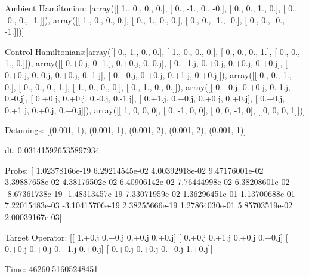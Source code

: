 \documentclass{article}
\begin{document}
    

\newpage

Ambient Hamiltonian: [array([[ 1.,  0.,  0.,  0.],
       [ 0., -1.,  0., -0.],
       [ 0.,  0.,  1.,  0.],
       [ 0., -0.,  0., -1.]]), array([[ 1.,  0.,  0.,  0.],
       [ 0.,  1.,  0.,  0.],
       [ 0.,  0., -1., -0.],
       [ 0.,  0., -0., -1.]])]

Control Hamiltonians:[array([[ 0.,  1.,  0.,  0.],
       [ 1.,  0.,  0.,  0.],
       [ 0.,  0.,  0.,  1.],
       [ 0.,  0.,  1.,  0.]]), array([[ 0.+0.j,  0.-1.j,  0.+0.j,  0.-0.j],
       [ 0.+1.j,  0.+0.j,  0.+0.j,  0.+0.j],
       [ 0.+0.j,  0.-0.j,  0.+0.j,  0.-1.j],
       [ 0.+0.j,  0.+0.j,  0.+1.j,  0.+0.j]]), array([[ 0.,  0.,  1.,  0.],
       [ 0.,  0.,  0.,  1.],
       [ 1.,  0.,  0.,  0.],
       [ 0.,  1.,  0.,  0.]]), array([[ 0.+0.j,  0.+0.j,  0.-1.j,  0.-0.j],
       [ 0.+0.j,  0.+0.j,  0.-0.j,  0.-1.j],
       [ 0.+1.j,  0.+0.j,  0.+0.j,  0.+0.j],
       [ 0.+0.j,  0.+1.j,  0.+0.j,  0.+0.j]]), array([[ 1,  0,  0,  0],
       [ 0, -1,  0,  0],
       [ 0,  0, -1,  0],
       [ 0,  0,  0,  1]])]

Detunings: [(0.001, 1), (0.001, 1), (0.001, 2), (0.001, 2), (0.001, 1)]

 dt: 0.031415926535897934

Probs: [  1.02378166e-19   6.29214545e-02   4.00392918e-02   9.47176001e-02
   3.39887658e-02   4.38176502e-02   6.40906142e-02   7.76444998e-02
   6.38208601e-02  -8.67361738e-19  -1.48313457e-19   7.33071959e-02
   1.36296451e-01   1.13700688e-01   7.22015483e-03  -3.10415706e-19
   2.38255666e-19   1.27864030e-01   5.85703519e-02   2.00039167e-03]

Target Operator: [[ 1.+0.j  0.+0.j  0.+0.j  0.+0.j]
 [ 0.+0.j  0.+1.j  0.+0.j  0.+0.j]
 [ 0.+0.j  0.+0.j  0.+1.j  0.+0.j]
 [ 0.+0.j  0.+0.j  0.+0.j  1.+0.j]]

Time: 46260.51605248451
\end{document}
